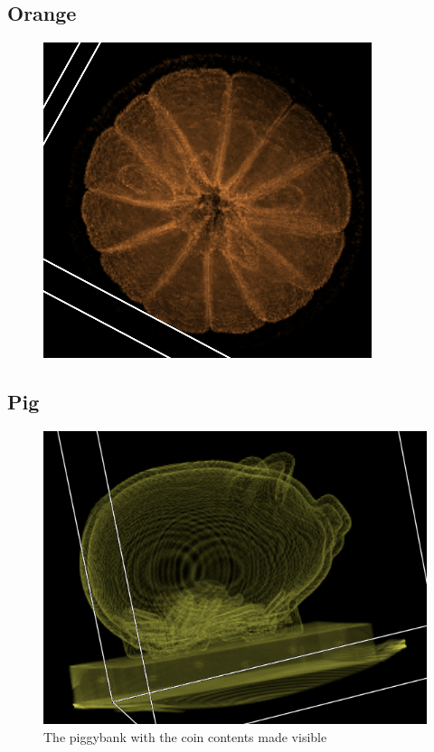 \documentclass[a4paper,twoside,11pt]{article}
\begin{document}
 \subsection{Orange}
 \begin{figure}[H]
 \centering
 \includegraphics[scale=0.5]{images/orangeOp}
 \caption{}
 \label{orangeOp}
 \end{figure}
 
 \subsection{Pig}
 \begin{figure}[H]
 \centering
 \includegraphics[scale=0.5]{images/pigOp}
 \caption{The piggybank with the coin contents made visible}
 \label{pigOp}
 \end{figure}
 
\end{document}
